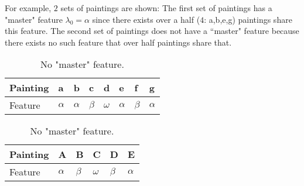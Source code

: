 For example, $2$ sets of paintings are shown: The first set of paintings has a "master" feature $\lambda_0 = \alpha$ since there exists over a half ($4$: a,b,e,g) paintings share this feature. The second set of paintings does not have a ``master" feature because there exists no such feature that over half paintings share that.
\begin{table}[!ht]
    \centering
    \begin{minipage}[b]{.5\linewidth}
    \centering
    \begin{tabular}{|l|l|l|l|l|l|l|l|}
    \hline
        Painting & a & b & c & d & e & f & g \\ \hline
        Feature & $\alpha$ & $\alpha$ & $\beta$ & $\omega$ & $\alpha$ & $\beta$ & $\alpha$ \\ \hline
    \end{tabular}
    \caption{A "master" feature $\lambda_0 = \alpha$.}
    \end{minipage}
    \begin{minipage}[b]{.4\linewidth}
    \centering
    \begin{tabular}{|l|l|l|l|l|l|}
    \hline
        Painting & A & B & C & D & E \\ \hline
        Feature & $\alpha$ & $\beta$ & $\omega$ & $\beta$ & $\alpha$ \\ \hline
    \end{tabular}
    \caption{No "master" feature.}
    \end{minipage}
\end{table}
\newpage
